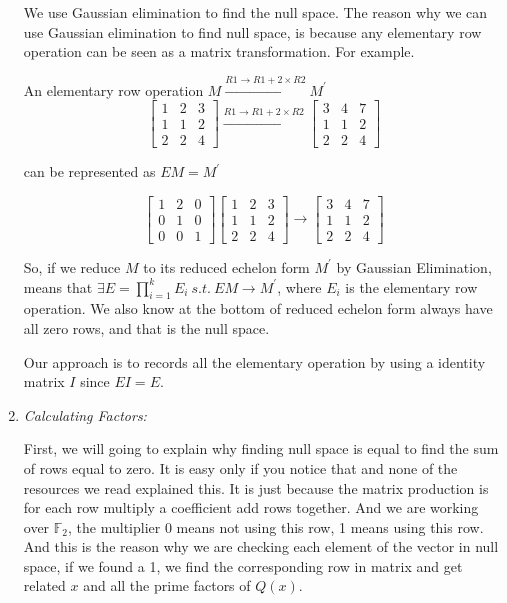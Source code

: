 \documentclass[12pt]{article} %
\newcommand{\itemgap}[1][2]{\vspace{#1mm}}
\begin{document}
\begin{enumerate}
We use Gaussian elimination to find the null space. The reason why we can use Gaussian elimination to find null space, is because any elementary row operation can be seen as a matrix transformation. For example.

An elementary row operation $M\xrightarrow{R1\rightarrow R1+2\times R2}M^\prime$
$$
\begin{bmatrix}
 1 & 2 & 3 \\
 1 & 1 & 2 \\
 2 & 2 & 4
\end{bmatrix}\xrightarrow{R1\rightarrow R1+2\times R2}
\begin{bmatrix}
 3 & 4 & 7 \\
 1 & 1 & 2 \\
 2 & 2 & 4
\end{bmatrix}
$$

can be represented as $EM=M^\prime$

$$
\begin{bmatrix}
 1 & 2 & 0 \\
 0 & 1 & 0 \\
 0 & 0 & 1
\end{bmatrix}
\begin{bmatrix}
 1 & 2 & 3 \\
 1 & 1 & 2 \\
 2 & 2 & 4
\end{bmatrix} \rightarrow
\begin{bmatrix}
 3 & 4 & 7 \\
 1 & 1 & 2 \\
 2 & 2 & 4
\end{bmatrix}
$$

So, if we reduce $M$ to its reduced echelon form $M^\prime$ by Gaussian Elimination, means that $\exists E=\prod_{i=1}^k{E_i}\ s.t.\ EM \rightarrow M^\prime$, where $E_i$ is the elementary row operation. We also know at the bottom of reduced echelon form always have all zero rows, and that is the null space. 

Our approach is to records all the elementary operation by using a identity matrix $I$ since $EI=E$.

\item \textit{Calculating Factors:} \itemgap

First, we will going to explain why finding null space is equal to find the sum of rows equal to zero. It is easy only if you notice that and none of the resources we read explained this. It is just because the matrix production is for each row multiply a coefficient add rows together. And we are working over $\mathbb{F}_2$, the multiplier 0 means not using this row, 1 means using this row. And this is the reason why we are checking each element of the vector in null space, if we found a 1, we find the corresponding row in matrix and get related $x$ and all the prime factors of $Q(x)$. 


\end{enumerate}
\end{document}
